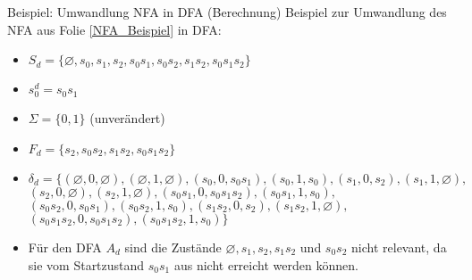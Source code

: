 \begin{frame}{Beispiel: Umwandlung NFA in DFA (Berechnung)}
	Beispiel zur Umwandlung des NFA aus Folie \ref{NFA_Beispiel} in DFA:
	\begin{itemize}
		\item $S_d=\{\varnothing, s_0, s_1, s_2, s_0s_1, s_0s_2, s_1s_2, s_0s_1s_2\}$
		\item $s_0^d=s_0s_1$
		\item $\Sigma=\{0,1\}$ (unverändert)
		\item $F_d=\{s_2, s_0s_2, s_1s_2, s_0s_1s_2\}$
		\item $\delta_d=\{(\varnothing, 0, \varnothing), (\varnothing, 1, \varnothing), (s_0, 0, s_0s_1), (s_0, 1, s_0), (s_1, 0, s_2), (s_1, 1, \varnothing),$\\
		\qquad $(s_2, 0, \varnothing), (s_2, 1, \varnothing), (s_0s_1, 0, s_0s_1s_2),(s_0s_1, 1, s_0),$\\
		\qquad $(s_0s_2, 0, s_0s_1), (s_0s_2, 1, s_0), (s_1s_2, 0, s_2), (s_1s_2, 1, \varnothing),$\\
		\qquad $(s_0s_1s_2, 0, s_0s_1s_2), (s_0s_1s_2, 1, s_0)\}$
		\item Für den DFA $A_d$ sind die Zustände $\varnothing, s_1, s_2, s_1s_2$ und $s_0s_2$ nicht relevant, da sie vom Startzustand $s_0s_1$ aus nicht erreicht werden können.
	\end{itemize}
\end{frame}

